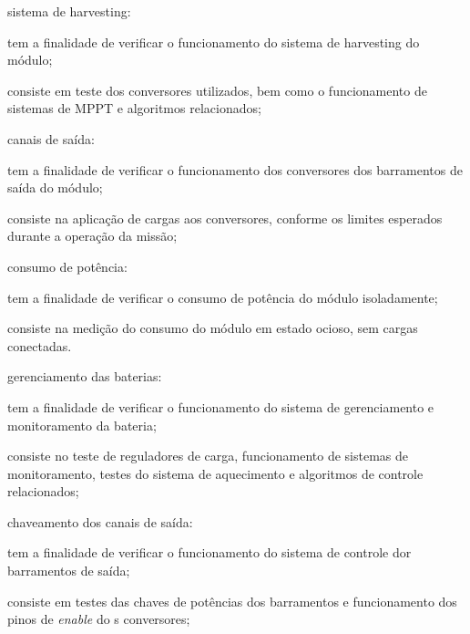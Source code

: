 \begin{alineas}
    \item sistema de harvesting:
    \begin{alineas}
        \item tem a finalidade de verificar o funcionamento do sistema de harvesting do módulo;
        \item consiste em teste dos conversores utilizados, bem como o funcionamento de sistemas de \gls{MPPT} e algoritmos relacionados;
    \end{alineas}

    \item canais de saída:
    \begin{alineas}
        \item tem a finalidade de verificar o funcionamento dos conversores dos barramentos de saída do módulo;
        \item consiste na aplicação de cargas aos conversores, conforme os limites esperados durante a operação da missão;
    \end{alineas}

    \item consumo de potência:
    \begin{alineas}
        \item tem a finalidade de verificar o consumo de potência do módulo isoladamente;
        \item consiste na medição do consumo do módulo em estado ocioso, sem cargas conectadas.
    \end{alineas}

    \item gerenciamento das baterias:
    \begin{alineas}
        \item tem a finalidade de verificar o funcionamento do sistema de gerenciamento e monitoramento da bateria;
        \item consiste no teste de reguladores de carga, funcionamento de sistemas de monitoramento, testes do sistema de aquecimento e algoritmos de controle relacionados;
    \end{alineas}

    \item chaveamento dos canais de saída:
    \begin{alineas}
        \item tem a finalidade de verificar o funcionamento do sistema de controle dor barramentos de saída;
        \item consiste em testes das chaves de potências dos barramentos e funcionamento dos pinos de \textit{enable} do s conversores;
    \end{alineas}


\end{alineas}
